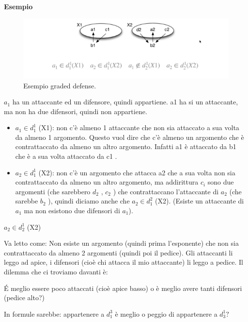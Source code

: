 \vspace{0.3cm}

\textbf{Esempio}

\begin{figure}[htp]
	\centering
    \includegraphics[width=13cm, keepaspectratio]{img/Cap8/defense.png}
    \caption{Esempio graded defense.}
\end{figure}
$a_1$ ha un attaccante ed un difensore, quindi appartiene. a1 ha si un attaccante, ma non ha due difensori, quindi non appartiene.
\newpage
\begin{itemize}
    \item $a_1 \in d^1_1$ (X1): non c’è almeno 1 attaccante che non sia attaccato a sua volta da almeno 1 argomento. Questo vuol dire che c’è almeno un argomento che è contrattaccato da almeno un altro argomento. Infatti a1 è attaccato da b1 che è a sua volta attaccato da c1 .
    \item $a_2 \in d^1_1$ (X2): non c’è un argomento che attacca a2 che a sua volta non sia contrattaccato da almeno un altro argomento, ma addirittura $c_i$ sono due argomenti (che sarebbero $d_2$ , $c_2$ ) che contrattaccano l’attaccante di $a_2$ (che sarebbe $b_2$ ), quindi diciamo anche che $a_2 \in d^2_1$ (X2). (Esiste un attaccante di $a_1$ ma non esistono due difensori di $a_1$).
\end{itemize}
\begin{center}
    $a_2 \in d^1_2$ (X2)
\end{center}
Va letto come: Non esiste un argomento (quindi prima l’esponente) che non sia contrattaccato da almeno 2 argomenti (quindi poi il pedice). Gli attaccanti li leggo ad apice, i difensori (cioè chi attacca il mio attaccante) li leggo a pedice. Il dilemma che ci troviamo davanti è:
\begin{center}
    É meglio essere poco attaccati (cioè apice basso) o è meglio avere tanti difensori (pedice alto?)
\end{center}
In formule sarebbe: appartenere a $d^3_1$ è meglio o peggio di appartenere a $d^1_3?$
